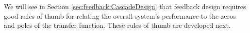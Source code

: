 We will see in Section \ref{sec:feedback:CascadeDesign} that feedback design requires good rules of thumb for relating the overall system's performance to the zeros and poles of the transfer function. These rules of thumb are developed next.




